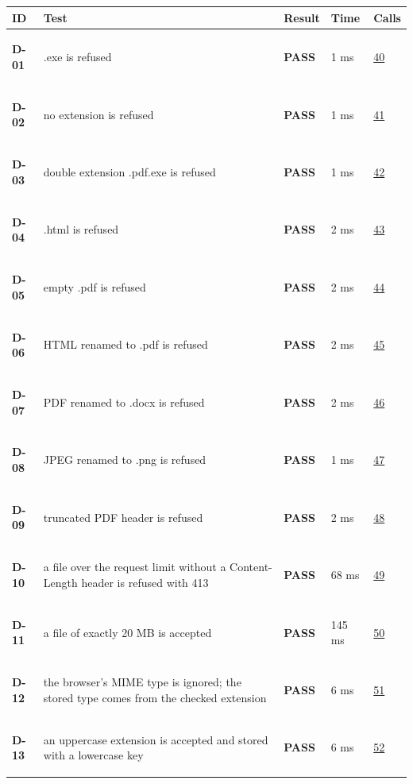 \documentclass[10pt,a4paper]{article}
\begin{document}
\begin{longtable}{@{}P{1.2cm}P{9.2cm}P{1.2cm}P{1.3cm}P{2.4cm}@{}}
\toprule \textbf{ID} & \textbf{Test} & \textbf{Result} & \textbf{Time} & \textbf{Calls} \\ \midrule \endhead
\hypertarget{test-D-01}{\textbf{D-01}} & .exe is refused & \textcolor{passgreen}{\textbf{PASS}} & 1 ms & \hyperlink{call40}{40} \\
\hypertarget{test-D-02}{\textbf{D-02}} & no extension is refused & \textcolor{passgreen}{\textbf{PASS}} & 1 ms & \hyperlink{call41}{41} \\
\hypertarget{test-D-03}{\textbf{D-03}} & double extension .pdf.exe is refused & \textcolor{passgreen}{\textbf{PASS}} & 1 ms & \hyperlink{call42}{42} \\
\hypertarget{test-D-04}{\textbf{D-04}} & .html is refused & \textcolor{passgreen}{\textbf{PASS}} & 2 ms & \hyperlink{call43}{43} \\
\hypertarget{test-D-05}{\textbf{D-05}} & empty .pdf is refused & \textcolor{passgreen}{\textbf{PASS}} & 2 ms & \hyperlink{call44}{44} \\
\hypertarget{test-D-06}{\textbf{D-06}} & HTML renamed to .pdf is refused & \textcolor{passgreen}{\textbf{PASS}} & 2 ms & \hyperlink{call45}{45} \\
\hypertarget{test-D-07}{\textbf{D-07}} & PDF renamed to .docx is refused & \textcolor{passgreen}{\textbf{PASS}} & 2 ms & \hyperlink{call46}{46} \\
\hypertarget{test-D-08}{\textbf{D-08}} & JPEG renamed to .png is refused & \textcolor{passgreen}{\textbf{PASS}} & 1 ms & \hyperlink{call47}{47} \\
\hypertarget{test-D-09}{\textbf{D-09}} & truncated PDF header is refused & \textcolor{passgreen}{\textbf{PASS}} & 2 ms & \hyperlink{call48}{48} \\
\hypertarget{test-D-10}{\textbf{D-10}} & a file over the request limit without a Content-Length header is refused with 413 & \textcolor{passgreen}{\textbf{PASS}} & 68 ms & \hyperlink{call49}{49} \\
\hypertarget{test-D-11}{\textbf{D-11}} & a file of exactly 20 MB is accepted & \textcolor{passgreen}{\textbf{PASS}} & 145 ms & \hyperlink{call50}{50} \\
\hypertarget{test-D-12}{\textbf{D-12}} & the browser's MIME type is ignored; the stored type comes from the checked extension & \textcolor{passgreen}{\textbf{PASS}} & 6 ms & \hyperlink{call51}{51} \\
\hypertarget{test-D-13}{\textbf{D-13}} & an uppercase extension is accepted and stored with a lowercase key & \textcolor{passgreen}{\textbf{PASS}} & 6 ms & \hyperlink{call52}{52} \\

\end{longtable}
\end{document}
